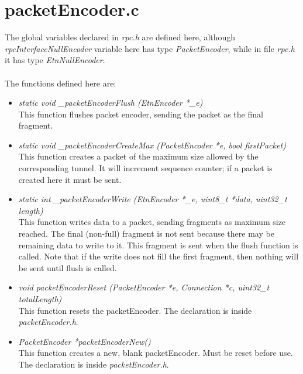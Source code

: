 \section{packetEncoder.c}
The global variables declared in \emph{rpc.h} are defined here, although \emph{rpcInterfaceNullEncoder} variable here has type \emph{PacketEncoder}, while in file \emph{rpc.h} it has type \emph{EtnNullEncoder}.\\\\
The functions defined here are:
\begin{itemize}

\item \emph{static void \_packetEncoderFlush (EtnEncoder *\_e)}\\
This function flushes packet encoder, sending the packet as the final fragment.
\item \emph{static void \_packetEncoderCreateMax (PacketEncoder *e, bool firstPacket)}\\
This function creates a packet of the maximum size allowed by the corresponding tunnel. It will increment sequence counter; if a packet is created here it must be sent.
\item \emph{static int \_packetEncoderWrite (EtnEncoder *\_e, uint8\_t *data, uint32\_t length)}\\
This function writes data to a packet, sending fragments as maximum size reached. The final (non-full) fragment is not sent because there may be remaining data to write to it. This fragment is sent when the flush function is called. Note that if the write does not fill the first fragment, then nothing will be sent until flush is called.
\item \emph{void packetEncoderReset (PacketEncoder *e, Connection *c, uint32\_t totalLength)}\\
This function resets the packetEncoder. The declaration is inside \emph{packetEncoder.h}.
\item \emph{PacketEncoder *packetEncoderNew()}\\
This function creates a new, blank packetEncoder. Must be reset before use. The declaration is inside \emph{packetEncoder.h}.

\end{itemize}
